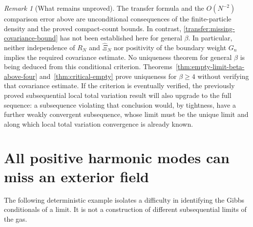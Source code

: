 \documentclass[11pt,a4paper]{article}
\numberwithin{equation}{section}
\theoremstyle{definition}
\theoremstyle{remark}
\newtheorem{remark}[theorem]{Remark}
\begin{document}
\begin{remark}[What remains unproved]
\label{rem:transfer-gap}
The transfer formula and the $O(N^{-2})$ comparison error above are
unconditional consequences of the finite-particle density and the
proved compact-count bounds. In contrast,
\eqref{transfer:missing-covariance-bound} has not been established
here for general $\beta$. In particular, neither independence of
$R_N$ and $\widehat\Xi_N$ nor positivity of the boundary weight
$G_n$ implies the required covariance estimate. No uniqueness theorem
for general $\beta$ is being deduced from this conditional criterion.
Theorems~\ref{thm:empty-limit-beta-above-four} and~\ref{thm:critical-empty}
prove uniqueness for $\beta\ge4$ without verifying that covariance estimate.
If the criterion is eventually verified, the previously proved
subsequential local total variation result will also upgrade to the
full sequence: a subsequence violating that conclusion would, by
tightness, have a further weakly convergent subsequence, whose limit
must be the unique limit and along which local total variation
convergence is already known.
\end{remark}


\section{All positive harmonic modes can miss an exterior field}
\label{sec:boundary-memory}

The following deterministic example isolates a difficulty in identifying
the Gibbs conditionals of a limit. It is not a construction of different
subsequential limits of the gas.
\end{document}
